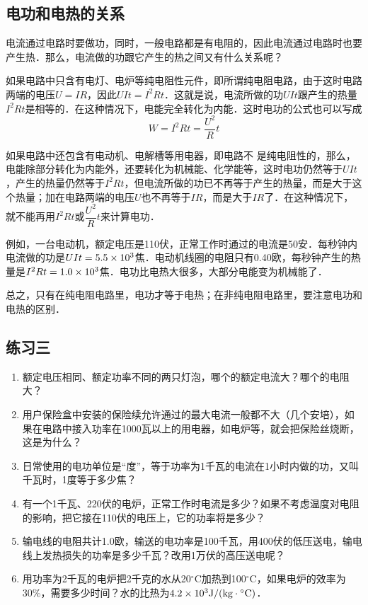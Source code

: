 \subsection{电功和电热的关系} 

电流通过电路时要做功，同时，一般电路都是有电阻的，因此电流通过电路时也要产生热．那么，电流做的功跟它产生的热之间又有什么关系呢？

如果电路中只含有电灯、电炉等纯电阻性元件，即所谓纯电阻电路，由于这时电路两端的电压$U=IR$，因此$UIt=I^2Rt$．这就是说，电流所做的功$UIt$跟产生的热量$I^2Rt$是相等的．在这种情况下，电能完全转化为内能．这时电功的公式也可以写成
\[W=I^2Rt=\frac{U^2}{R}t\]

如果电路中还包含有电动机、电解槽等用电器，即电路不
是纯电阻性的，那么，电能除部分转化为内能外，还要转化为机械能、化学能等，这时电功仍然等于$UIt$，产生的热量仍然等于$I^2Rt$，但电流所做的功已不再等于产生的热量，而是大于这个热量；加在电路两端的电压$U$也不再等于$IR$，而是大于$IR$了．在这种情况下，就不能再用$I^2Rt$或$\dfrac{U^2}{R}t$来计算电功．

例如，一台电动机，额定电压是110伏，正常工作时通过的电流是50安．每秒钟内电流做的功是$UIt=5.5\times10^3$焦．电动机线圈的电阻只有0.40欧，每秒钟产生的热量是$I^2Rt=1.0\times10^3$焦．电功比电热大很多，大部分电能变为机械能了．

总之，只有在纯电阻电路里，电功才等于电热；在非纯电阻电路里，要注意电功和电热的区别．

\subsection*{练习三}
\begin{enumerate}
    \item 额定电压相同、额定功率不同的两只灯泡，哪个的额定电流大？哪个的电阻大？
    \item 用户保险盒中安装的保险续允许通过的最大电流一般都不大（几个安培），如果在电路中接入功率在1000瓦以上的用电器，如电炉等，就会把保险丝烧断，这是为什么？
    \item 日常使用的电功单位是“度”，等于功率为1千瓦的电流在1小时内做的功，又叫千瓦时，1度等于多少焦？
    \item 有一个1千瓦、220伏的电炉，正常工作时电流是多少？如果不考虑温度对电阻的影响，把它接在110伏的电压上，它的功率将是多少？
    \item 输电线的电阻共计1.0欧，输送的电功率是100千瓦，用400伏的低压送电，输电线上发热损失的功率是多少千瓦？改用1万伏的高压送电呢？
    \item 用功率为2千瓦的电炉把2千克的水从20$^\circ$C加热到100$^\circ$C，如果电炉的效率为30\%，需要多少时间？水的比热为$4.2\times10^3{\rm J}/({\rm kg}\cdot {}^\circ {\rm C})$．
\end{enumerate}

